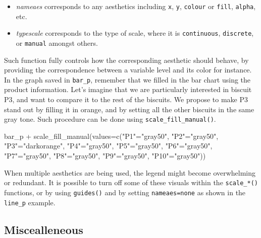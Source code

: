 \documentclass[
]{book}
\newenvironment{Shaded}{\begin{snugshade}}{\end{snugshade}}
\newcommand{\AttributeTok}[1]{\textcolor[rgb]{0.77,0.63,0.00}{#1}}
\newcommand{\FunctionTok}[1]{\textcolor[rgb]{0.00,0.00,0.00}{#1}}
\newcommand{\NormalTok}[1]{#1}
\newcommand{\OtherTok}[1]{\textcolor[rgb]{0.56,0.35,0.01}{#1}}
\newcommand{\SpecialCharTok}[1]{\textcolor[rgb]{0.00,0.00,0.00}{#1}}
\newcommand{\StringTok}[1]{\textcolor[rgb]{0.31,0.60,0.02}{#1}}
\providecommand{\tightlist}{%
  \setlength{\itemsep}{0pt}\setlength{\parskip}{0pt}}
\begin{document}
\begin{itemize}
\tightlist
\item
  \emph{nameaes} corresponds to any aesthetics including \texttt{x}, \texttt{y}, \texttt{colour} or \texttt{fill}, \texttt{alpha}, etc.
\item
  \emph{typescale} corresponds to the type of scale, where it is \texttt{continuous}, \texttt{discrete}, or \texttt{manual} amongst others.
\end{itemize}

Such function fully controls how the corresponding aesthetic should behave, by providing the correspondence between a variable level and its color for instance. In the graph saved in \texttt{bar\_p}, remember that we filled in the bar chart using the product information. Let's imagine that we are particularly interested in biscuit P3, and want to compare it to the rest of the biscuits. We propose to make P3 stand out by filling it in orange, and by setting all the other biscuits in the same gray tone.
Such procedure can be done using \texttt{scale\_fill\_manual()}.

\begin{Shaded}
\begin{Highlighting}[]
\NormalTok{bar\_p }\SpecialCharTok{+} 
  \FunctionTok{scale\_fill\_manual}\NormalTok{(}\AttributeTok{values=}\FunctionTok{c}\NormalTok{(}\StringTok{"P1"}\OtherTok{=}\StringTok{"gray50"}\NormalTok{, }\StringTok{"P2"}\OtherTok{=}\StringTok{"gray50"}\NormalTok{, }\StringTok{"P3"}\OtherTok{=}\StringTok{"darkorange"}\NormalTok{, }\StringTok{"P4"}\OtherTok{=}\StringTok{"gray50"}\NormalTok{, }\StringTok{"P5"}\OtherTok{=}\StringTok{"gray50"}\NormalTok{,}
                             \StringTok{"P6"}\OtherTok{=}\StringTok{"gray50"}\NormalTok{, }\StringTok{"P7"}\OtherTok{=}\StringTok{"gray50"}\NormalTok{, }\StringTok{"P8"}\OtherTok{=}\StringTok{"gray50"}\NormalTok{, }\StringTok{"P9"}\OtherTok{=}\StringTok{"gray50"}\NormalTok{, }\StringTok{"P10"}\OtherTok{=}\StringTok{"gray50"}\NormalTok{))}
\end{Highlighting}
\end{Shaded}

When multiple aesthetics are being used, the legend might become overwhelming or redundant. It is possible to turn off some of these visuals within the \texttt{scale\_*()} functions, or by using \texttt{guides()} and by setting \texttt{nameaes=\textquotesingle{}none\textquotesingle{}} as shown in the \texttt{line\_p} example.

\hypertarget{miscealleneous}{%
\subsection{Miscealleneous}\label{miscealleneous}}
\end{document}
